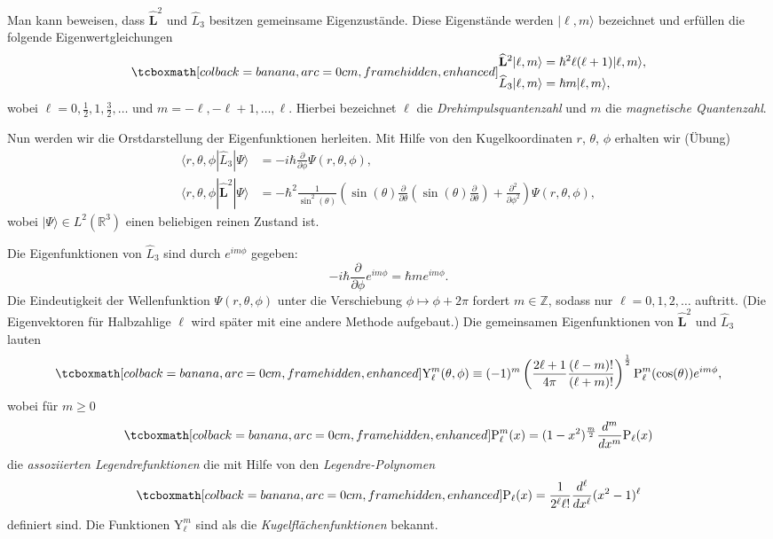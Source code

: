 Man kann beweisen, dass $\widehat{\mathbf{L}}^2$ und $\widehat{L}_3$ besitzen gemeinsame Eigenzustände. Diese Eigenstände werden $|\ell,m\rangle$ bezeichnet und erfüllen die folgende Eigenwertgleichungen 
\begin{equation}
	\eqbox{
	\begin{aligned}
		\widehat{\mathbf{L}}^2|\ell,m\rangle &= \hbar^2\ell(\ell+1)|\ell,m\rangle, \\
		\widehat{L}_3|\ell,m\rangle &= \hbar m|\ell,m\rangle,
	\end{aligned}
	}
\end{equation}
wobei $\ell = 0, \frac12, 1, \frac32, \ldots$ und $m = -\ell, -\ell + 1, \ldots, \ell$. Hierbei bezeichnet $\ell$ die \emph{Drehimpulsquantenzahl} und $m$ die \emph{magnetische Quantenzahl}.

Nun werden wir die Orstdarstellung der Eigenfunktionen herleiten. Mit Hilfe von den Kugelkoordinaten $r$, $\theta$, $\phi$ erhalten wir (Übung)
\begin{equation}
	\begin{split}
		\langle r,\theta,\phi|\widehat{L}_3|\Psi\rangle &= -i\hbar \frac{\partial}{\partial \phi} \Psi(r,\theta,\phi), \\
		\langle r,\theta,\phi|\widehat{\mathbf{L}}^2|\Psi\rangle &= -\hbar^2\frac{1}{\sin^2(\theta)}\left(\sin(\theta)\frac{\partial}{\partial \theta}\left(\sin(\theta)\frac{\partial}{\partial \theta}\right) + \frac{\partial^2}{\partial \phi^2}\right) \Psi(r,\theta,\phi),
	\end{split}
\end{equation}
wobei $|\Psi\rangle \in L^2(\mathbb{R}^3)$ einen beliebigen reinen Zustand ist. 

Die Eigenfunktionen von $\widehat{L}_3$ sind durch $e^{im\phi}$ gegeben:
\begin{equation}
	-i\hbar \frac{\partial}{\partial \phi}e^{im\phi} = \hbar m e^{im\phi}.
\end{equation}
Die Eindeutigkeit der Wellenfunktion $\Psi(r,\theta,\phi)$ unter die Verschiebung $\phi\mapsto \phi+2\pi$ fordert $m\in \mathbb{Z}$, sodass nur $\ell = 0,1,2, \ldots$ auftritt. (Die Eigenvektoren für Halbzahlige $\ell$ wird später mit eine andere Methode aufgebaut.) Die gemeinsamen Eigenfunktionen von $\widehat{\mathbf{L}}^2$ und $\widehat{L}_3$ lauten
\begin{equation}
	\eqbox{\text{Y}_\ell^m (\theta,\phi) \equiv (-1)^m\left(\frac{2\ell + 1}{4\pi}\frac{(\ell-m)!}{(\ell+m)!}\right)^{\frac12} \text{P}_\ell^m(\cos(\theta))e^{im\phi},}
\end{equation}
wobei für $m\ge 0$
\begin{equation}
	\eqbox{\text{P}^m_\ell(x) = (1-x^2)^{\frac{m}{2}}\frac{d^m}{dx^m}\text{P}_\ell(x)}
\end{equation}
die \emph{assoziierten Legendrefunktionen} die mit Hilfe von den \emph{Legendre-Polynomen}
\begin{equation}
	\eqbox{\text{P}_\ell(x)=\frac{1}{2^\ell \ell!} \frac{d^\ell}{dx^\ell}(x^2-1)^\ell}
\end{equation}
definiert sind. Die Funktionen $\text{Y}_\ell^m$ sind als die \emph{Kugelflächenfunktionen} bekannt. 


